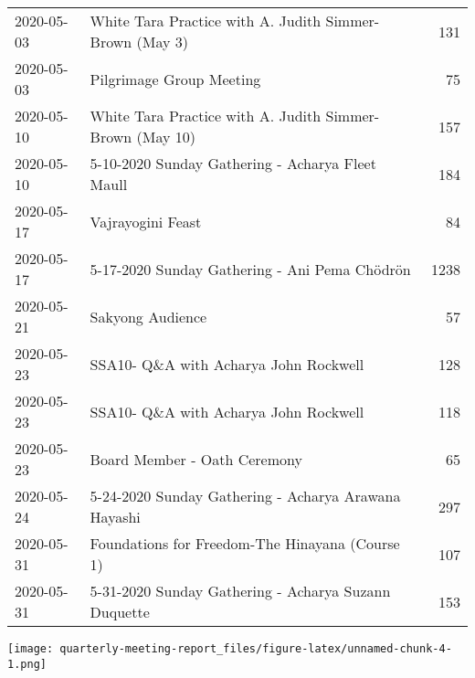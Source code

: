 \documentclass[
]{article}
\begin{document}
\begin{longtable}{llr}
2020-05-03 & White Tara Practice with A. Judith Simmer-Brown (May 3) & 131 \\ 
2020-05-03 & Pilgrimage Group Meeting & 75 \\ 
2020-05-10 & White Tara Practice with A. Judith Simmer-Brown (May 10) & 157 \\ 
2020-05-10 & 5-10-2020 Sunday Gathering - Acharya Fleet Maull & 184 \\ 
2020-05-17 & Vajrayogini Feast & 84 \\ 
2020-05-17 & 5-17-2020 Sunday Gathering - Ani Pema Chödrön & 1238 \\ 
2020-05-21 & Sakyong Audience & 57 \\ 
2020-05-23 & SSA10- Q\&A with Acharya John Rockwell & 128 \\ 
2020-05-23 & SSA10- Q\&A with Acharya John Rockwell & 118 \\ 
2020-05-23 & Board Member - Oath Ceremony & 65 \\ 
2020-05-24 & 5-24-2020 Sunday Gathering - Acharya Arawana Hayashi & 297 \\ 
2020-05-31 & Foundations for Freedom-The Hinayana (Course 1) & 107 \\ 
2020-05-31 & 5-31-2020 Sunday Gathering - Acharya Suzann Duquette & 153 \\ 
\bottomrule
\end{longtable}

\texttt{[image: quarterly-meeting-report\_files/figure-latex/unnamed-chunk-4-1.png]}
\captionsetup[table]{labelformat=empty,skip=1pt}
\end{document}
